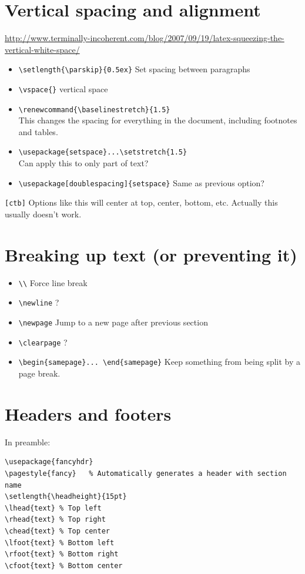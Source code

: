 \documentclass{article}
\begin{document}
\section{Vertical spacing and alignment}
\url{http://www.terminally-incoherent.com/blog/2007/09/19/latex-squeezing-the-vertical-white-space/}
\begin{itemize}
    \item \verb|\setlength{\parskip}{0.5ex}| Set spacing between paragraphs
    \item \verb|\vspace{}| vertical space
    \item \verb|\renewcommand{\baselinestretch}{1.5}|\\
        This changes the spacing for everything in the document,
        including footnotes and tables.
    \item \verb|\usepackage{setspace}...\setstretch{1.5}|\\
        Can apply this to only part of text?
    \item \verb|\usepackage[doublespacing]{setspace}|
        Same as previous option?
\end{itemize}
\verb|[ctb]| Options like this will center at top, center, bottom, etc.
Actually this usually doesn't work.

\section{Breaking up text (or preventing it)}
\begin{itemize}
    \item \verb|\\| Force line break
    \item \verb|\newline| ?
    \item \verb|\newpage| Jump to a new page after previous section
    \item \verb|\clearpage|  ?
    \item \verb|\begin{samepage}... \end{samepage}| Keep something from
        being split by a page break.
\end{itemize}

\section{Headers and footers}\label{headfoot}
In preamble:
\begin{lstlisting}
\usepackage{fancyhdr}
\pagestyle{fancy}   % Automatically generates a header with section name
\setlength{\headheight}{15pt}
\lhead{text} % Top left
\rhead{text} % Top right
\chead{text} % Top center
\lfoot{text} % Bottom left
\rfoot{text} % Bottom right
\cfoot{text} % Bottom center
\end{lstlisting}
\end{document}
